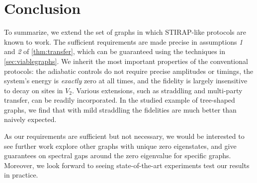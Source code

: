 \section{Conclusion}
\label{sec:conclusion}
To summarize, we extend the set of graphs in which STIRAP-like protocols are known to work. The sufficient requirements are made precise in assumptions \emph{1} and \emph{2} of \cref{thm:transfer}, which can be guaranteed using the techniques in \cref{sec:viablegraphs}. We inherit the most important properties of the conventional protocols: the adiabatic controls do not require precise amplitudes or timings, the system's energy is \emph{exactly} zero at all times, and the fidelity is largely insensitive to decay on sites in $V_2$. Various extensions, such as straddling and multi-party transfer, can be readily incorporated. In the studied example of tree-shaped graphs, we find that with mild straddling the fidelities are much better than naively expected. 

As our requirements are sufficient but not necessary, we would be interested to see further work explore other graphs with unique zero eigenstates, and give guarantees on spectral gaps around the zero eigenvalue for specific graphs. Moreover, we look forward to seeing state-of-the-art experiments test our results in practice. 


